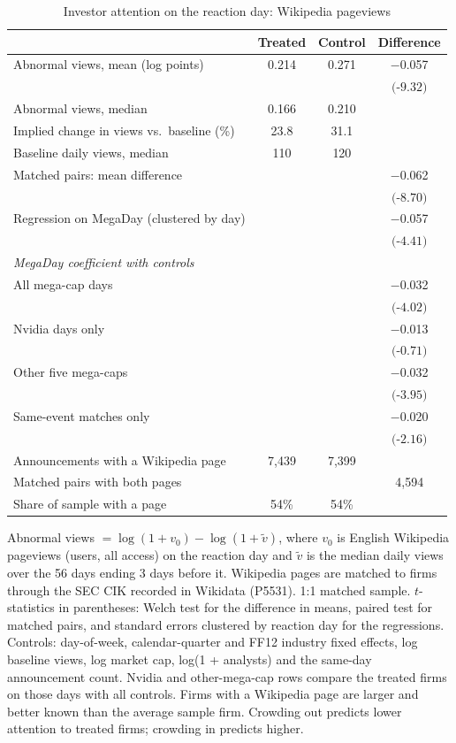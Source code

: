 \begin{table}[htbp]
\centering
\small
\caption{Investor attention on the reaction day: Wikipedia pageviews}
\label{tab:attention}
\begin{tabular}{lccc}
\toprule
 & Treated & Control & Difference \\
\midrule
Abnormal views, mean (log points) & 0.214 & 0.271 & $-$0.057 \\
 & & & $($-$9.32)$ \\
Abnormal views, median & 0.166 & 0.210 & \\
Implied change in views vs.\ baseline (\%) & 23.8 & 31.1 & \\
Baseline daily views, median & 110 & 120 & \\
\midrule
Matched pairs: mean difference & & & $-$0.062 \\
 & & & $($-$8.70)$ \\
Regression on MegaDay (clustered by day) & & & $-$0.057 \\
 & & & $($-$4.41)$ \\
\midrule
\multicolumn{4}{l}{\emph{MegaDay coefficient with controls}} \\
All mega-cap days & & & $-$0.032 \\
 & & & $($-$4.02)$ \\
Nvidia days only & & & $-$0.013 \\
 & & & $($-$0.71)$ \\
Other five mega-caps & & & $-$0.032 \\
 & & & $($-$3.95)$ \\
Same-event matches only & & & $-$0.020 \\
 & & & $($-$2.16)$ \\
\midrule
Announcements with a Wikipedia page & 7,439 & 7,399 & \\
Matched pairs with both pages & & & 4,594 \\
Share of sample with a page & 54\% & 54\% & \\
\bottomrule
\end{tabular}
\par\medskip
\parbox{0.95\linewidth}{\footnotesize Abnormal views $=\log(1+v_0)-\log(1+\tilde v)$, where $v_0$ is English Wikipedia pageviews (users, all access) on the reaction day and $\tilde v$ is the median daily views over the 56 days ending 3 days before it. Wikipedia pages are matched to firms through the SEC CIK recorded in Wikidata (P5531). 1:1 matched sample. $t$-statistics in parentheses: Welch test for the difference in means, paired test for matched pairs, and standard errors clustered by reaction day for the regressions. Controls: day-of-week, calendar-quarter and FF12 industry fixed effects, log baseline views, log market cap, log(1 + analysts) and the same-day announcement count. Nvidia and other-mega-cap rows compare the treated firms on those days with all controls. Firms with a Wikipedia page are larger and better known than the average sample firm. Crowding out predicts lower attention to treated firms; crowding in predicts higher.}
\end{table}

